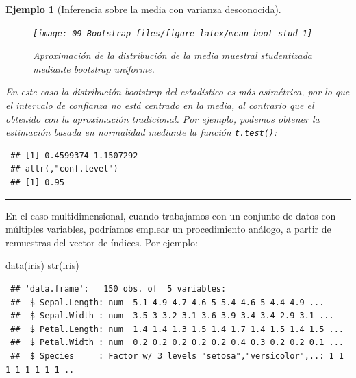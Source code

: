 \documentclass[
]{book}
\newenvironment{Shaded}{\begin{snugshade}}{\end{snugshade}}
\newcommand{\FunctionTok}[1]{\textcolor[rgb]{0.00,0.00,0.00}{#1}}
\newcommand{\NormalTok}[1]{#1}
\newcommand{\SpecialCharTok}[1]{\textcolor[rgb]{0.00,0.00,0.00}{#1}}
\theoremstyle{break}
\newtheorem{example}{Ejemplo}[chapter]
\theoremstyle{nonumberplain}
\begin{document}
\begin{example}[Inferencia sobre la media con varianza desconocida]
\begin{figure}[!htb]

{\centering \texttt{[image: 09-Bootstrap\_files/figure-latex/mean-boot-stud-1]} 

}

\caption{Aproximación de la distribución de la media muestral studentizada mediante bootstrap uniforme.}\label{fig:mean-boot-stud}
\end{figure}

En este caso la distribución bootstrap del estadístico es más asimétrica, por lo que el intervalo de confianza no está centrado en la media,
al contrario que el obtenido con la aproximación tradicional.
Por ejemplo, podemos obtener la estimación basada en normalidad mediante la función \texttt{t.test()}:

\begin{Shaded}
\end{Shaded}

\begin{verbatim}
 ## [1] 0.4599374 1.1507292
 ## attr(,"conf.level")
 ## [1] 0.95
\end{verbatim}

\end{example}

\begin{center}\rule{0.5\linewidth}{0.5pt}\end{center}

En el caso multidimensional, cuando trabajamos con un conjunto de datos con múltiples variables, podríamos emplear un procedimiento análogo, a partir de remuestras del vector de índices.
Por ejemplo:

\begin{Shaded}
\begin{Highlighting}[]
\FunctionTok{data}\NormalTok{(iris)}
\FunctionTok{str}\NormalTok{(iris)}
\end{Highlighting}
\end{Shaded}

\begin{verbatim}
 ## 'data.frame':   150 obs. of  5 variables:
 ##  $ Sepal.Length: num  5.1 4.9 4.7 4.6 5 5.4 4.6 5 4.4 4.9 ...
 ##  $ Sepal.Width : num  3.5 3 3.2 3.1 3.6 3.9 3.4 3.4 2.9 3.1 ...
 ##  $ Petal.Length: num  1.4 1.4 1.3 1.5 1.4 1.7 1.4 1.5 1.4 1.5 ...
 ##  $ Petal.Width : num  0.2 0.2 0.2 0.2 0.2 0.4 0.3 0.2 0.2 0.1 ...
 ##  $ Species     : Factor w/ 3 levels "setosa","versicolor",..: 1 1 1 1 1 1 1 1 ..
\end{verbatim}
\end{document}
